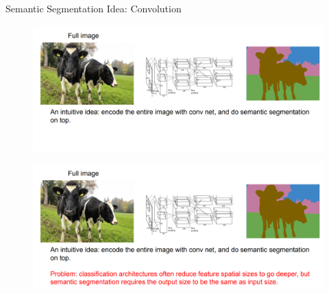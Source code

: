 \documentclass[10pt]{beamer}
\theoremstyle{remark}
\theoremstyle{definition}
\begin{document}
\begin{frame}[allowframebreaks]{Semantic Segmentation Idea: Convolution}
\begin{figure}
\centering
\includegraphics[width=1.0\textwidth,height=1.0\textheight,keepaspectratio]{./images/sem_5.png}
\end{figure}

\framebreak

\begin{figure}
\centering
\includegraphics[width=1.0\textwidth,height=1.0\textheight,keepaspectratio]{./images/sem_6.png}
\end{figure}
    
\end{frame}
\end{document}
